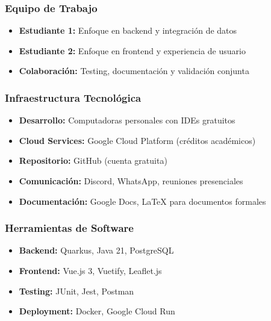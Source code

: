 \subsubsection{Equipo de Trabajo}
\begin{itemize}
    \item \textbf{Estudiante 1:} Enfoque en backend y integración de datos
    \item \textbf{Estudiante 2:} Enfoque en frontend y experiencia de usuario
    \item \textbf{Colaboración:} Testing, documentación y validación conjunta
\end{itemize}

\subsubsection{Infraestructura Tecnológica}
\begin{itemize}
    \item \textbf{Desarrollo:} Computadoras personales con IDEs gratuitos
    \item \textbf{Cloud Services:} Google Cloud Platform (créditos académicos)
    \item \textbf{Repositorio:} GitHub (cuenta gratuita)
    \item \textbf{Comunicación:} Discord, WhatsApp, reuniones presenciales
    \item \textbf{Documentación:} Google Docs, LaTeX para documentos formales
\end{itemize}

\subsubsection{Herramientas de Software}
\begin{itemize}
    \item \textbf{Backend:} Quarkus, Java 21, PostgreSQL
    \item \textbf{Frontend:} Vue.js 3, Vuetify, Leaflet.js
    \item \textbf{Testing:} JUnit, Jest, Postman
    \item \textbf{Deployment:} Docker, Google Cloud Run
\end{itemize}
